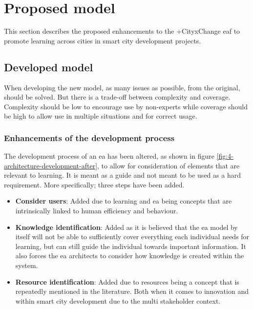 \chapter{Proposed model}
\label{chap:model}
This section describes the proposed enhancements to the  +CityxChange \gls{eaf} to promote learning across cities in smart city development projects.
\section{Developed model} %

When developing the new model, as many issues as possible, from the original, should be solved. But there is a trade-off between complexity and coverage. Complexity should be low to encourage use by non-experts while coverage should be high to allow use in multiple situations and for correct usage. 

\subsection{Enhancements of the development process}


The development process of an \gls{ea} has been altered, as shown in figure \ref{fig:4-architecture-development-after}, to allow for consideration of elements that are relevant to learning. It is meant as a guide and not meant to be used as a hard requirement. More specifically; three steps have been added.
\begin{itemize}
    \item \textbf{Consider users}: Added due to learning and \gls{ea} being concepts that are intrinsically linked to human efficiency and behaviour.
    \item \textbf{Knowledge identification}: Added as it is believed that the \gls{ea} model by itself will not be able to sufficiently cover everything each individual needs for learning, but can still guide the individual towards important information. It also forces the \gls{ea} architects to consider how knowledge is created within the system.
    \item \textbf{Resource identification}: Added due to resources being a concept that is repeatedly mentioned in the literature. Both when it comes to innovation and within smart city development due to the multi stakeholder context.
\end{itemize}


